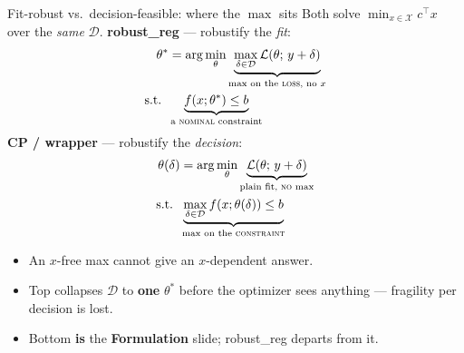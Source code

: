 \documentclass{beamer}
\begin{document}
\begin{frame}{Fit-robust vs.\ decision-feasible: where the $\max$ sits}
  \small
  Both solve $\min_{x\in\mathcal X} c^\top x$ over the \emph{same} $\mathcal D$.
  \textbf{robust\_reg} --- robustify the \emph{fit}:
  \[
  \begin{aligned}
    \theta^\ast &= \arg\min_\theta
      \underbrace{\max_{\delta\in\mathcal D}\mathcal L(\theta;\,y+\delta)}
                 _{\text{\scriptsize max on the \textsc{loss}, no $x$}} \\
    \text{s.t.}\;\; & \underbrace{f(x;\theta^\ast)\le b}
                 _{\text{\scriptsize a \textsc{nominal} constraint}}
  \end{aligned}
  \]
  \textbf{CP / wrapper} --- robustify the \emph{decision}:
  \[
  \begin{aligned}
    \theta(\delta) &= \arg\min_\theta
      \underbrace{\mathcal L(\theta;\,y+\delta)}
                 _{\text{\scriptsize plain fit, \textsc{no} max}} \\
    \text{s.t.}\;\; & \underbrace{\max_{\delta\in\mathcal D} f(x;\theta(\delta))\le b}
                 _{\text{\scriptsize max on the \textsc{constraint}}}
  \end{aligned}
  \]
  \begin{itemize}
    \item An $x$-free max cannot give an $x$-dependent answer.
    \item Top collapses $\mathcal D$ to \textbf{one} $\theta^\ast$ before the
      optimizer sees anything --- fragility per decision is lost.
    \item Bottom \textbf{is} the \textbf{Formulation} slide; robust\_reg departs from it.
  \end{itemize}
\end{frame}
\end{document}
